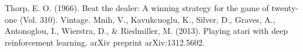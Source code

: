 \documentclass[conference]{IEEEtran}
\begin{document}

\begin{thebibliography}{00}
 Thorp, E. O. (1966). Beat the dealer: A winning strategy for the game of twenty-one (Vol. 310). Vintage.
 Mnih, V., Kavukcuoglu, K., Silver, D., Graves, A., Antonoglou, I., Wierstra, D., \& Riedmiller, M. (2013). Playing atari with deep reinforcement learning. arXiv preprint arXiv:1312.5602.
\end{thebibliography}
\end{document}
